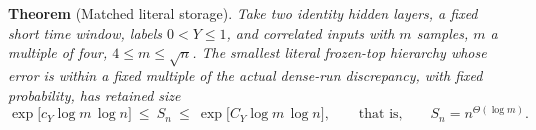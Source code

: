 \documentclass[12pt,border=2pt]{standalone}
\begin{document}
\begin{minipage}{7.1in}
\textbf{Theorem} (Matched literal storage).
\textit{Take two identity hidden layers, a fixed short time window, labels
$0<Y\le1$, and correlated inputs with $m$ samples, $m$ a multiple of four,
$4\le m\le\sqrt n$. The smallest literal frozen-top hierarchy whose error is
within a fixed multiple of the actual dense-run discrepancy, with fixed
probability, has retained size}
\[
 \exp\big[c_Y\log m\,\log n\big]\ \le\ S_n\ \le\ \exp\big[C_Y\log m\,\log n\big],
 \qquad\text{that is,}\qquad S_n=n^{\Theta(\log m)}.
\]
\end{minipage}
\end{document}

